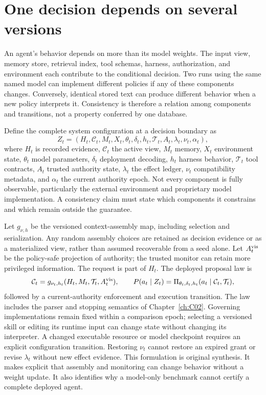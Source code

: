 \section{One decision depends on several versions}\label{sec:C17:state}
An agent's behavior depends on more than its model weights. The input view, memory store, retrieval index, tool schemas, harness, authorization, and environment each contribute to the conditional decision. Two runs using the same named model can implement different policies if any of these components changes. Conversely, identical stored text can produce different behavior when a new policy interprets it. Consistency is therefore a relation among components and transitions, not a property conferred by one database.

Define the complete system configuration at a decision boundary as
\begin{equation}
 Z_t=(H_t,\mathcal C_t,M_t,X_t,\theta_t,\delta_t,h_t,\mathcal T_t,A_t,\lambda_t,\nu_t,\alpha_t),
\end{equation}
where $H_t$ is recorded evidence, $\mathcal C_t$ the active view, $M_t$ memory, $X_t$ environment state, $\theta_t$ model parameters, $\delta_t$ deployment decoding, $h_t$ harness behavior, $\mathcal T_t$ tool contracts, $A_t$ trusted authority state, $\lambda_t$ the effect ledger, $\nu_t$ compatibility metadata, and $\alpha_t$ the current authority epoch. Not every component is fully observable, particularly the external environment and proprietary model implementation. A consistency claim must state which components it constrains and which remain outside the guarantee.

Let $g_{\nu,h}$ be the versioned context-assembly map, including selection and serialization. Any random assembly choices are retained as decision evidence or as a materialized view, rather than assumed recoverable from a seed alone. Let $A_t^{\rm vis}$ be the policy-safe projection of authority; the trusted monitor can retain more privileged information. The request is part of $H_t$. The deployed proposal law is
\begin{equation}
 \mathcal C_t=g_{\nu_t,h_t}(H_t,M_t,\mathcal T_t,A_t^{\rm vis}),
 \qquad P(a_t\mid Z_t)=\Pi_{\theta_t,\delta_t,h_t}(a_t\mid\mathcal C_t,\mathcal T_t),
\end{equation}
followed by a current-authority enforcement and execution transition. The law includes the parser and stopping semantics of Chapter~\ref{ch:C02}. Governing implementations remain fixed within a comparison epoch; selecting a versioned skill or editing its runtime input can change state without changing its interpreter. A changed executable resource or model checkpoint requires an explicit configuration transition. Restoring $\nu_t$ cannot restore an expired grant or revise $\lambda_t$ without new effect evidence. This formulation is original synthesis. It makes explicit that assembly and monitoring can change behavior without a weight update. It also identifies why a model-only benchmark cannot certify a complete deployed agent.

